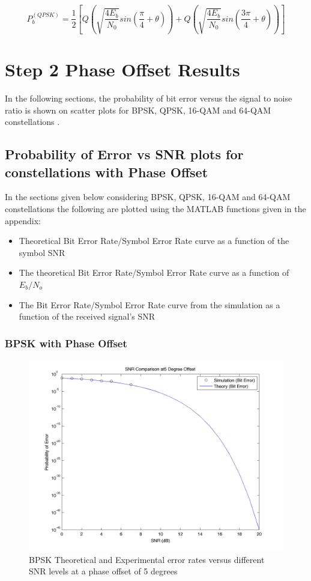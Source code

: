 \documentclass[]{article}
\begin{document}
\begin{equation}
P_b^{\left( QPSK \right)} = \frac{1}{2}\left[Q\left(\sqrt{\frac{4E_b}{N_0}}sin\left(\frac{\pi}{4}+\theta\right)\right) + Q\left(\sqrt{\frac{4E_b}{N_0}}sin\left(\frac{3\pi}{4}+\theta\right)\right)\right]
\end{equation}

\section{Step 2 Phase Offset Results}
\label{sec:results_po}
In the following sections, the probability of bit error versus the signal to noise ratio is shown on scatter plots for BPSK, QPSK, 16-QAM and 64-QAM constellations .

\subsection{Probability of Error vs SNR plots for constellations with Phase Offset}
In the sections given below considering BPSK, QPSK, 16-QAM and 64-QAM constellations the following  are plotted using the MATLAB functions given in the appendix:
\begin{itemize}
\item Theoretical Bit Error Rate/Symbol Error Rate curve as a function of the symbol SNR
\item The theoretical Bit Error Rate/Symbol Error Rate curve as a function of $E_b/N_o$
\item The Bit Error Rate/Symbol Error Rate curve from the simulation as a function of the received signal's SNR
\end{itemize}

\subsubsection{BPSK with Phase Offset}
\label{sec:bpsk_phase}
\begin{figure}[H]
\centering
\hspace*{-2cm}\includegraphics[width=1.3\textwidth]{bpSNRpo1.jpg}
\caption{BPSK Theoretical and Experimental error rates versus different SNR levels at a phase offset of 5 degrees }
\end{figure}
\end{document}
